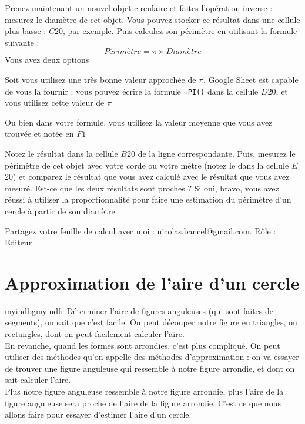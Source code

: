 \documentclass{exam}
\begin{document}
\begin{questions}
\question Prenez maintenant un nouvel objet circulaire et faites l'opération inverse : mesurez le diamètre de cet objet. Vous pouvez stocker ce résultat dans une cellule plus basse : $C20$, par exemple. Puis calculez son périmètre en utilisant la formule suivante :
\[
Périmètre = \pi \times Diamètre
\]
Vous avez deux options
\begin{compactitem}
  \item {} Soit vous utilisez une très bonne valeur approchée de $\pi$. Google Sheet est capable de vous la fournir : vous pouvez écrire la formule \verb|=PI()| dans la cellule $D20$, et vous utilisez cette valeur de $\pi$
  \item Ou bien dans votre formule, vous utilisez la valeur moyenne que vous avez trouvée et notée en $F1$
\end{compactitem}
Notez le résultat dans la cellule $B20$ de la ligne correspondante. Puis, mesurez le périmètre de cet objet avec votre corde ou votre mètre (notez le dans la cellule $E$20) et comparez le résultat que vous avez calculé avec le résultat que vous avez mesuré. Est-ce que les deux résultats sont proches ? Si oui, bravo, vous avez réussi à utiliser la proportionnalité pour faire une estimation du périmètre d'un cercle à partir de son diamètre.

\question Partagez votre feuille de calcul avec moi : nicolas.bancel@gmail.com. Rôle : Editeur

\end{questions}

\section{Approximation de l'aire d'un cercle}

\begin{Indication}{myindbg}{myindfr}
Déterminer l'aire de figures anguleuses (qui sont faites de segments), on sait que c'est facile. On peut découper notre figure en triangles, ou rectangles, dont on peut facilement calculer l'aire. \\

En revanche, quand les formes sont arrondies, c'est plus compliqué. On peut utiliser des méthodes qu'on appelle des méthodes d'approximation : on va essayer de trouver une figure anguleuse qui ressemble à notre figure arrondie, et dont on sait calculer l'aire. \\

Plus notre figure anguleuse ressemble à notre figure arrondie, plus l'aire de la figure anguleuse sera proche de l'aire de la figure arrondie. C'est ce que nous allons faire pour essayer d'estimer l'aire d'un cercle.
\end{Indication}
\end{document}
